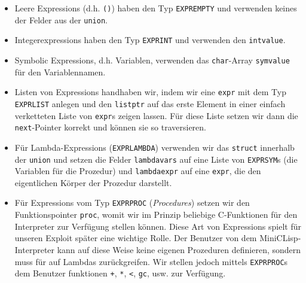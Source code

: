 \begin{itemize}
    \item Leere Expressions (d.h. \texttt{()}) haben den Typ \texttt{EXPREMPTY}
      und verwenden keines der Felder aus der \texttt{union}.
    \item Integerexpressions haben den Typ \texttt{EXPRINT} und verwenden den
      \texttt{intvalue}.
    \item Symbolic Expressions, d.h. Variablen, verwenden das
      \texttt{char}-Array \texttt{symvalue} für den Variablennamen.
    \item Listen von Expressions handhaben wir, indem wir eine \texttt{expr}
      mit dem Typ \texttt{EXPRLIST} anlegen und den \texttt{listptr} auf das
      erste Element in einer einfach verketteten Liste von \texttt{expr}s
      zeigen lassen. Für diese Liste setzen wir dann die \texttt{next}-Pointer
      korrekt und können sie so traversieren.
    \item Für Lambda-Expressions (\texttt{EXPRLAMBDA}) verwenden wir das
      \texttt{struct} innerhalb der \texttt{union} und setzen die Felder
      \texttt{lambdavars} auf eine Liste von \texttt{EXPRSYM}s (die Variablen
      für die Prozedur) und \texttt{lambdaexpr} auf eine \texttt{expr}, die
      den eigentlichen Körper der Prozedur darstellt.
    \item Für Expressions vom Typ \texttt{EXPRPROC} (\emph{Procedures}) setzen wir den
      Funktionspointer \texttt{proc}, womit wir im Prinzip beliebige
      C-Funktionen für den Interpreter zur Verfügung stellen können.
      Diese Art von Expressions spielt für unseren Exploit später eine
      wichtige Rolle.
      Der Benutzer von dem MiniCLisp-Interpreter kann auf diese Weise keine
      eigenen Prozeduren definieren, sondern muss für auf Lambdas
      zurückgreifen. Wir stellen jedoch mittels \texttt{EXPRPROC}s dem 
      Benutzer funktionen \texttt{+}, \texttt{*}, \texttt{<}, \texttt{gc}, usw.
      zur Verfügung.

\end{itemize}

